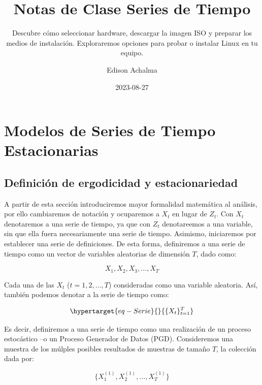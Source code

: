 \documentclass[
  a4paper,
]{article}
\title{Notas de Clase Series de Tiempo}
\subtitle{Descubre cómo seleccionar hardware, descargar la imagen ISO y
preparar los medios de instalación. Exploraremos opciones para probar o
instalar Linux en tu equipo.}
\author{Edison Achalma}
\date{2023-08-27}
\begin{document}
\maketitle
\ifdefined\Shaded\renewenvironment{Shaded}{\begin{tcolorbox}[frame hidden, interior hidden, breakable, enhanced, borderline west={3pt}{0pt}{shadecolor}, sharp corners, boxrule=0pt]}{\end{tcolorbox}}\fi

\hypertarget{modelos-de-series-de-tiempo-estacionarias}{%
\section{Modelos de Series de Tiempo
Estacionarias}\label{modelos-de-series-de-tiempo-estacionarias}}

\hypertarget{definiciuxf3n-de-ergodicidad-y-estacionariedad}{%
\subsection{Definición de ergodicidad y
estacionariedad}\label{definiciuxf3n-de-ergodicidad-y-estacionariedad}}

A partir de esta sección introduciremos mayor formalidad matemática al
análisis, por ello cambiaremos de notación y ocuparemos a \(X_t\) en
lugar de \(Z_t\). Con \(X_t\) denotaremos a una serie de tiempo, ya que
con \(Z_t\) denotareemos a una variable, sin que ella fuera
necesariamente una serie de tiempo. Asimismo, iniciaremos por establecer
una serie de definiciones. De esta forma, definiremos a una serie de
tiempo como un vector de variables aleatorias de dimensión \(T\), dado
como:

\[
X_1, X_2, X_3, \ldots ,X_T
\]

Cada una de las \(X_t\) (\(t = 1, 2, \ldots, T\)) consideradas como una
variable aleatoria. Así, también podemos denotar a la serie de tiempo
como:

\begin{equation}\protect\hypertarget{eq-Serie}{}{
\{ X_t \}^T_{t = 1}
}\label{eq-Serie}\end{equation}

Es decir, definiremos a una serie de tiempo como una realización de un
proceso estocástico --o un Proceso Generador de Datos (PGD).
Consideremos una muestra de los múlples posibles resultados de muestras
de tamaño \(T\), la colección dada por:

\[
\{X^{(1)}_1, X^{(1)}_2, \ldots, X^{(1)}_T\}
\]
\end{document}
